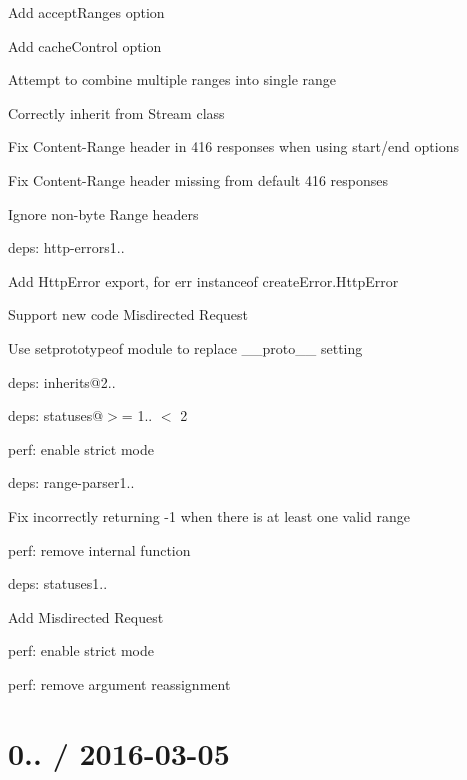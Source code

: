 \begin{DoxyItemize}
\item Add {\ttfamily accept\+Ranges} option
\item Add {\ttfamily cache\+Control} option
\item Attempt to combine multiple ranges into single range
\item Correctly inherit from {\ttfamily Stream} class
\item Fix {\ttfamily Content-\/\+Range} header in 416 responses when using {\ttfamily start}/{\ttfamily end} options
\item Fix {\ttfamily Content-\/\+Range} header missing from default 416 responses
\item Ignore non-\/byte {\ttfamily Range} headers
\item deps\+: http-\/errors1..
\begin{DoxyItemize}
\item Add {\ttfamily Http\+Error} export, for {\ttfamily err instanceof create\+Error.\+Http\+Error}
\item Support new code { Misdirected Request}
\item Use {\ttfamily setprototypeof} module to replace {\ttfamily \+\_\+\+\_\+proto\+\_\+\+\_\+} setting
\item deps\+: inherits@2..
\item deps\+: statuses@\textquotesingle{}$>$= 1.. $<$ 2\textquotesingle{}
\item perf\+: enable strict mode
\end{DoxyItemize}
\item deps\+: range-\/parser1..
\begin{DoxyItemize}
\item Fix incorrectly returning -\/1 when there is at least one valid range
\item perf\+: remove internal function
\end{DoxyItemize}
\item deps\+: statuses1..
\begin{DoxyItemize}
\item Add { Misdirected Request}
\item perf\+: enable strict mode
\end{DoxyItemize}
\item perf\+: remove argument reassignment
\end{DoxyItemize}

\section*{0.. / 2016-\/03-\/05 }


